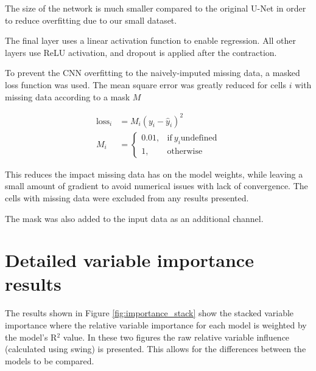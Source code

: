 \documentclass[final,3p,times,onecolumn,sort&compress]{elsarticle}
\begin{document}
The size of the network is much smaller compared to the original U-Net in order to reduce overfitting due to our small dataset.

The final layer uses a linear activation function to enable regression. All other layers use ReLU activation, and dropout is applied after the contraction.

To prevent the CNN overfitting to the naively-imputed missing data, a masked loss function was used. The mean square error was greatly reduced for cells $i$ with missing data according to a mask $M$

\begin{align*}
    \mathrm{loss}_i &= M_i(y_i - \hat y _i) ^ 2\\
    M_i &= \begin{cases}
      0.01, & \text{if}\ y_i \mathrm{undefined} \\
      1, & \text{otherwise}
    \end{cases}
\end{align*}

This reduces the impact missing data has on the model weights, while leaving a small amount of gradient to avoid numerical issues with lack of convergence. The cells with missing data were excluded from any results presented.

The mask was also added to the input data as an additional channel.

\newpage
\section{Detailed variable importance results }
\label{ss:varimp}

The results shown in Figure \ref{fig:importance_stack} show the stacked variable importance where the relative variable importance for each model is weighted by the model's R$^2$ value. In these two figures the raw relative variable influence (calculated using swing) is presented. This allows for the differences between the models to be compared.
\end{document}
